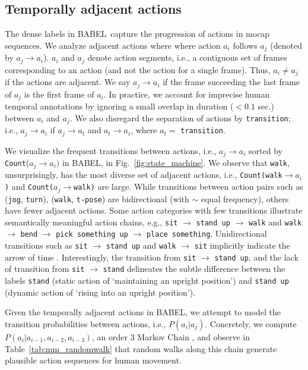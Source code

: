 \documentclass[final]{cvpr}
\def\babel{BABEL}
\begin{document}
\noindent
\subsection{Temporally adjacent actions}
The dense labels in \babel~capture the progression of actions in mocap sequences. 
We analyze adjacent actions where where action $a_i$ follows $a_j$ (denoted by $a_j \rightarrow a_i$). 
$a_i$ and $a_j$ denote action segments, i.e., a contiguous set of frames corresponding to an action (and not the action for a single frame). Thus, $a_i \neq a_j$ if the actions are adjacent. 
We say $a_j \rightarrow a_i$ if the frame succeeding the last frame of $a_j$ is the first frame of $a_i$. 
In practice, we account for imprecise human temporal annotations by ignoring a small overlap in duration ($<0.1$ sec.) between $a_i$ and $a_j$. 
We also disregard the separation of actions by \texttt{transition};
i.e., $a_j \rightarrow a_i$ if $a_j \rightarrow a_t$ and $a_t \rightarrow a_i$, where $a_t = $ \texttt{transition}. 

We visualize the frequent transitions between actions, i.e., $a_j \rightarrow a_i$ sorted by \texttt{Count}($a_j \rightarrow a_i)$ in \babel, in Fig.~\ref{fig:state_machine}. 
We observe that \texttt{walk}, unsurprisingly, has the most diverse set of adjacent actions, i.e., \texttt{Count(walk}$\rightarrow a_i$\texttt{)} and \texttt{Count(}$a_j\rightarrow$\texttt{walk)} are large. 
While transitions between action pairs such as (\texttt{jog}, \texttt{turn}), (\texttt{walk}, \texttt{t-pose}) are bidirectional (with $\sim$ equal frequency), others have fewer adjacent actions. 
Some action categories with few transitions illustrate semantically meaningful action chains, e.g., \texttt{sit} $\rightarrow$ \texttt{stand up} $\rightarrow$ \texttt{walk} and \texttt{walk} $\rightarrow$ \texttt{bend} $\rightarrow$ \texttt{pick something up} $\rightarrow$ \texttt{place something}. 
Unidirectional transitions such as \texttt{sit} $\rightarrow$ \texttt{stand up} and \texttt{walk} $\rightarrow$ \texttt{sit} implicitly indicate the arrow of time \cite{DBLP:conf/cvpr/PickupPWSZZSF14}. 
Interestingly, the transition from \texttt{sit} $\rightarrow$ \texttt{stand up}, and the lack of transition from \texttt{sit} $\rightarrow$ \texttt{stand} delineates the subtle difference between the labels \texttt{stand} (static action of `maintaining an upright position') and \texttt{stand up} (dynamic action of `rising into an upright position'). 

Given the temporally adjacent actions in \babel, we attempt to model the transition probabilities between actions, i.e., $P(a_i|a_j)$. 
Concretely, we compute $P(a_i|a_{i-1}, a_{i-2}, a_{i-3})$, an order $3$ Markov Chain \cite{gagniuc2017markov}, 
and observe in Table~\ref{tab:mm_randomwalk} that random walks along this chain generate plausible action sequences for human movement. 
\end{document}
